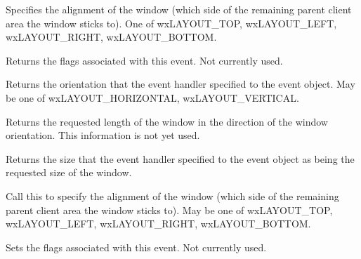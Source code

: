 Specifies the alignment of the window (which side of the remaining parent client area
the window sticks to). One of wxLAYOUT\_TOP, wxLAYOUT\_LEFT, wxLAYOUT\_RIGHT, wxLAYOUT\_BOTTOM.

\label{wxquerylayoutinfoeventgetflags}


Returns the flags associated with this event. Not currently used.

\label{wxquerylayoutinfoeventgetorientation}


Returns the orientation that the event handler specified to the event object. May be one of wxLAYOUT\_HORIZONTAL,
wxLAYOUT\_VERTICAL.

\label{wxquerylayoutinfoeventgetrequestedlength}


Returns the requested length of the window in the direction of the window orientation. This information
is not yet used.

\label{wxquerylayoutinfoeventgetsize}


Returns the size that the event handler specified to the event object as being the requested size of the window.

\label{wxquerylayoutinfoeventsetalignment}


Call this to specify the alignment of the window (which side of the remaining parent client area
the window sticks to). May be one of wxLAYOUT\_TOP, wxLAYOUT\_LEFT, wxLAYOUT\_RIGHT, wxLAYOUT\_BOTTOM.

\label{wxquerylayoutinfoeventsetflags}


Sets the flags associated with this event. Not currently used.

\label{wxquerylayoutinfoeventsetorientation}

